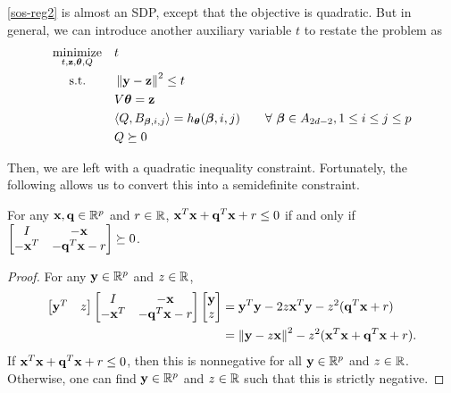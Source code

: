 \documentclass[11pt]{article}
\begin{document}
\eqref{sos-reg2} is almost an SDP, except that the objective is quadratic. But in general, we can introduce another auxiliary variable $t$ to restate the problem as
\begin{equation}\label{sos-reg3}
\begin{aligned}
& \underset{t, {\bf z}, {\boldsymbol\theta}, Q}{\text{minimize}}
& & t \\
& \text{\quad\ s.t.}
& & \left\lVert {\bf y}-{\bf z} \right\rVert^2 \leq t \\
& & & V{\boldsymbol\theta} = {\bf z} \\
& & & \langle{Q, B_{{\boldsymbol\beta}, i, j}} \rangle = h_{\boldsymbol\theta}({\boldsymbol\beta}, i, j) \qquad \forall\ {\boldsymbol\beta} \in A_{2d - 2}, 1 \le i \le j \le p \\
& & & Q \succeq 0 
\end{aligned}
\end{equation}

Then, we are left with a quadratic inequality constraint. Fortunately, the following allows us to convert this into a semidefinite constraint.
\begin{lemma}
For any ${\bf x}, {\bf q} \in {\mathbb R}^p$ and $r \in {\mathbb R}$, ${\bf x}^T{\bf x} + {\bf q}^T{\bf x} + r \leq 0$ if and only if $\begin{bmatrix} I & -{\bf x} \\ -{\bf x}^T & -{\bf q}^T{\bf x} - r \end{bmatrix} \succeq 0$.
\end{lemma}
\begin{proof}
For any ${\bf y} \in {\mathbb R}^p$ and $z \in {\mathbb R}$, 
\begin{align*}
\begin{bmatrix} {\bf y}^T & z \end{bmatrix} \begin{bmatrix} I & -{\bf x} \\ -{\bf x}^T & -{\bf q}^T{\bf x} - r \end{bmatrix} \begin{bmatrix} {\bf y} \\ z \end{bmatrix} &= {\bf y}^T{\bf y} -2z{\bf x}^T{\bf y} - z^2({\bf q}^T{\bf x}+r) \\
&= \left\lVert {\bf y} - z{\bf x} \right\rVert^2 - z^2({\bf x}^T{\bf x} + {\bf q}^T{\bf x} + r).
\end{align*}
If ${\bf x}^T{\bf x} + {\bf q}^T{\bf x} + r \leq 0$, then this is nonnegative for all ${\bf y} \in {\mathbb R}^p$ and $z \in {\mathbb R}$. Otherwise, one can find ${\bf y} \in {\mathbb R}^p$ and $z \in {\mathbb R}$ such that this is strictly negative.
\end{proof}
\end{document}
